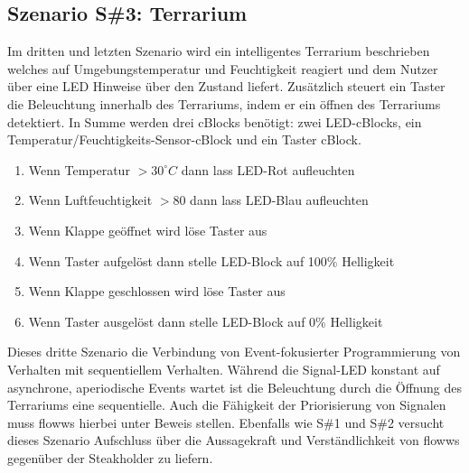 \subsection{Szenario S\#3: Terrarium}
Im dritten und letzten Szenario wird ein intelligentes Terrarium beschrieben welches auf Umgebungstemperatur und Feuchtigkeit reagiert und dem Nutzer über eine LED Hinweise über den Zustand liefert. Zusätzlich steuert ein Taster die Beleuchtung innerhalb des Terrariums, indem er ein öffnen des Terrariums detektiert. In Summe werden drei cBlocks benötigt: zwei LED-cBlocks, ein Temperatur/Feuchtigkeits-Sensor-cBlock und ein Taster cBlock.
\begin{enumerate}
    \item Wenn Temperatur $>30^{\circ}C$ dann lass LED-Rot aufleuchten
    \item Wenn Luftfeuchtigkeit $>80$ dann lass LED-Blau aufleuchten
    \item Wenn Klappe geöffnet wird löse Taster aus
    \item Wenn Taster aufgelöst dann stelle LED-Block auf 100\% Helligkeit
    \item Wenn Klappe geschlossen wird löse Taster aus
    \item Wenn Taster ausgelöst dann stelle LED-Block auf 0\% Helligkeit
\end{enumerate}
Dieses dritte Szenario die Verbindung von Event-fokusierter Programmierung von Verhalten mit sequentiellem Verhalten. Während die Signal-LED konstant auf asynchrone, aperiodische Events wartet ist die Beleuchtung durch die Öffnung des Terrariums eine sequentielle. Auch die Fähigkeit der Priorisierung von Signalen muss flowws hierbei unter Beweis stellen. Ebenfalls wie S\#1 und S\#2 versucht dieses Szenario Aufschluss über die Aussagekraft und Verständlichkeit von flowws gegenüber der Steakholder zu liefern.